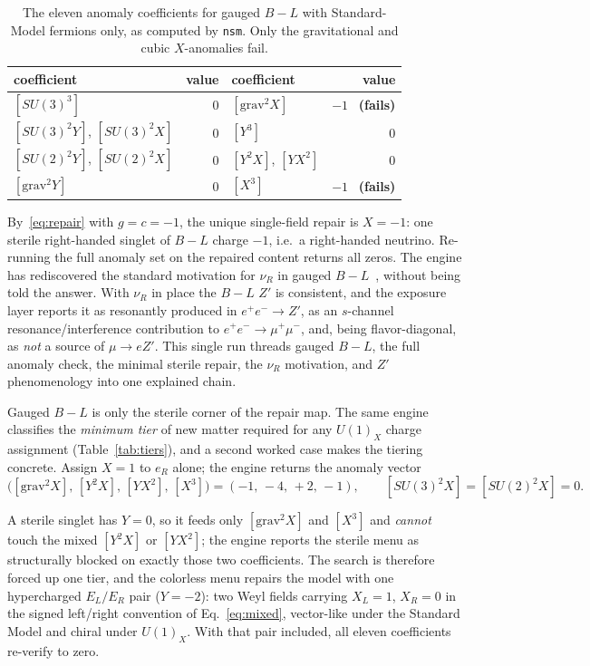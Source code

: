 \documentclass[11pt]{article}
\newcommand{\nsm}{\texttt{nsm}}
\newcommand{\UX}{U(1)_X}
\newcommand{\SUthree}{SU(3)}
\newcommand{\SUtwo}{SU(2)}
\begin{document}
\begin{table}[t]
\centering
\small
\begin{tabular}{@{}lrlr@{}}
\toprule
coefficient & value & coefficient & value\\
\midrule
$[\SUthree^3]$ & $0$ & $[\text{grav}^2 X]$ & $-1$ \ \textbf{(fails)}\\
$[\SUthree^2 Y]$, $[\SUthree^2 X]$ & $0$ & $[Y^3]$ & $0$\\
$[\SUtwo^2 Y]$, $[\SUtwo^2 X]$ & $0$ & $[Y^2 X]$, $[Y X^2]$ & $0$\\
$[\text{grav}^2 Y]$ & $0$ & $[X^3]$ & $-1$ \ \textbf{(fails)}\\
\bottomrule
\end{tabular}
\caption{The eleven anomaly coefficients for gauged $B\!-\!L$ with
Standard-Model fermions only, as computed by \nsm. Only the gravitational and
cubic $X$-anomalies fail.}
\label{tab:bml}
\end{table}

By~\eqref{eq:repair} with $g=c=-1$, the unique single-field repair is $X=-1$:
one sterile right-handed singlet of $B\!-\!L$ charge $-1$, i.e.\ a right-handed
neutrino. Re-running the full anomaly set on the repaired content returns all
zeros. The engine has rediscovered the standard motivation for $\nu_R$ in gauged
$B\!-\!L$~\cite{bminusL}, without being told the answer. With $\nu_R$ in place
the $B\!-\!L$ $Z'$ is consistent, and the exposure layer reports it as resonantly
produced in $e^+e^-\!\to Z'$, as an $s$-channel resonance/interference
contribution to $e^+e^-\!\to\mu^+\mu^-$, and, being flavor-diagonal, as
\emph{not} a source of
$\mu\to e Z'$. This single run threads gauged $B\!-\!L$, the full anomaly check,
the minimal sterile repair, the $\nu_R$ motivation, and $Z'$ phenomenology into
one explained chain.

Gauged $B\!-\!L$ is only the sterile corner of the repair map. The same engine
classifies the \emph{minimum tier} of new matter required for any $\UX$ charge
assignment (Table~\ref{tab:tiers}), and a second worked case makes the tiering
concrete. Assign $X=1$ to $e_R$ alone; the engine returns the anomaly vector
\[
\bigl([\text{grav}^2X],\,[Y^2X],\,[YX^2],\,[X^3]\bigr) = (-1,\,-4,\,+2,\,-1),
\qquad [\SUthree^2X]=[\SUtwo^2X]=0 .
\]

A sterile singlet has $Y=0$, so it feeds only $[\text{grav}^2X]$ and $[X^3]$ and
\emph{cannot} touch the mixed $[Y^2X]$ or $[YX^2]$; the engine reports the
sterile menu as structurally blocked on exactly those two coefficients. The
search is therefore forced up one tier, and the colorless menu repairs the model
with one hypercharged $E_L/E_R$ pair ($Y=-2$): two Weyl fields carrying
$X_L=1$, $X_R=0$ in the signed left/right convention of Eq.~\eqref{eq:mixed},
vector-like under the Standard Model and chiral under $\UX$. With that pair
included, all eleven coefficients re-verify to zero.
\end{document}
